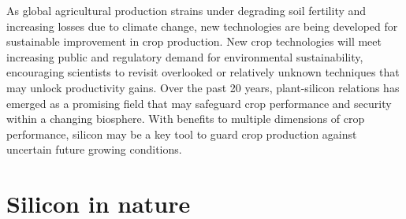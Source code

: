\documentclass[12pt, letterpaper, ]{report}
\begin{document}
As global agricultural production strains under degrading soil fertility and increasing losses due to climate change, new technologies are being developed for sustainable improvement in crop production. New crop technologies will meet increasing public and regulatory demand for environmental sustainability, encouraging scientists to revisit overlooked or relatively unknown techniques that may unlock productivity gains. Over the past 20 years, plant-silicon relations has emerged as a promising field that may safeguard crop performance and security within a changing biosphere. With benefits to multiple dimensions of crop performance, silicon may be a key tool to guard crop production against uncertain future growing conditions. 

\section{Silicon in nature}
\end{document}
